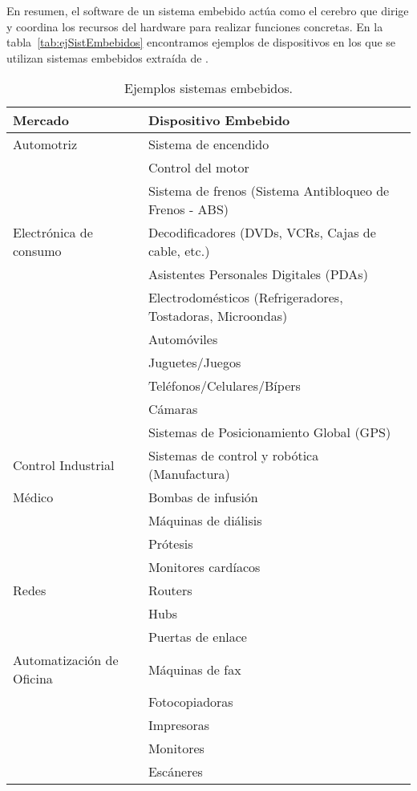 En resumen, el software de un sistema embebido actúa como el cerebro que dirige y coordina los recursos del hardware para realizar funciones concretas. En la tabla~\ref{tab:ejSistEmbebidos} encontramos ejemplos de dispositivos en los que se utilizan sistemas embebidos extraída de \cite{noergaard2005embedded}.

\begin{table}[h]
\caption{Ejemplos sistemas embebidos.}
    \centering
    \label{tab:ejSistEmbebidos}
    \begin{tabular}{|l|l|}
        \hline
        \textbf{Mercado} & \textbf{Dispositivo Embebido} \\ \hline
        Automotriz & Sistema de encendido \\ 
        & Control del motor \\ 
        & Sistema de frenos (Sistema Antibloqueo de Frenos - ABS) \\ \hline
        Electrónica de consumo & Decodificadores (DVDs, VCRs, Cajas de cable, etc.) \\ 
        & Asistentes Personales Digitales (PDAs) \\ 
        & Electrodomésticos (Refrigeradores, Tostadoras, Microondas) \\ 
        & Automóviles \\ 
        & Juguetes/Juegos \\ 
        & Teléfonos/Celulares/Bípers \\ 
        & Cámaras \\ 
        & Sistemas de Posicionamiento Global (GPS) \\ \hline
        Control Industrial & Sistemas de control y robótica (Manufactura) \\ \hline
        Médico & Bombas de infusión \\ 
        & Máquinas de diálisis \\ 
        & Prótesis \\ 
        & Monitores cardíacos \\ \hline
        Redes & Routers \\ 
        & Hubs \\ 
        & Puertas de enlace \\ \hline
        Automatización de Oficina & Máquinas de fax \\ 
        & Fotocopiadoras \\ 
        & Impresoras \\ 
        & Monitores \\ 
        & Escáneres \\ \hline
    \end{tabular}
    \label{tab:sistemas_embebidos}
\end{table}

